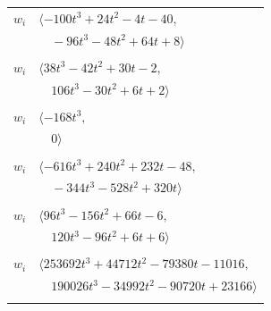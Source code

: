 \documentclass[11pt]{article}
\begin{document}
\begin{longtable}{@{}ll@{}}
$w_i$ & $\langle -100t^{3}+24t^{2}-4t-40,$\\
 & $\quad -96t^{3}-48t^{2}+64t+8\rangle$\\
\addlinespace[2pt]
\multicolumn{2}{@{}p{0.97\textwidth}@{}}{$i=33$, $D_i=6$, $\rho_{ij}$: $11{:}1, \allowbreak 26{:}1, \allowbreak 28{:}1, \allowbreak 29{:}2, \allowbreak 34{:}1, \allowbreak 38{:}2, \allowbreak 40{:}2, \allowbreak 43{:}2$}\\
$w_i$ & $\langle 38t^{3}-42t^{2}+30t-2,$\\
 & $\quad 106t^{3}-30t^{2}+6t+2\rangle$\\
\addlinespace[2pt]
\multicolumn{2}{@{}p{0.97\textwidth}@{}}{$i=34$, $D_i=12$, $\rho_{ij}$: $8{:}2, \allowbreak 9{:}2, \allowbreak 11{:}2, \allowbreak 23{:}1, \allowbreak 33{:}2$}\\
$w_i$ & $\langle -168t^{3},$\\
 & $\quad 0\rangle$\\
\addlinespace[2pt]
\multicolumn{2}{@{}p{0.97\textwidth}@{}}{$i=35$, $D_i=24$, $\rho_{ij}$: $2{:}2, \allowbreak 11{:}1, \allowbreak 21{:}2, \allowbreak 23{:}2, \allowbreak 24{:}1, \allowbreak 27{:}1, \allowbreak 28{:}2, \allowbreak 37{:}1$}\\
$w_i$ & $\langle -616t^{3}+240t^{2}+232t-48,$\\
 & $\quad -344t^{3}-528t^{2}+320t\rangle$\\
\addlinespace[2pt]
\multicolumn{2}{@{}p{0.97\textwidth}@{}}{$i=36$, $D_i=6$, $\rho_{ij}$: $4{:}1, \allowbreak 9{:}2, \allowbreak 10{:}2, \allowbreak 31{:}1, \allowbreak 38{:}2, \allowbreak 42{:}1$}\\
$w_i$ & $\langle 96t^{3}-156t^{2}+66t-6,$\\
 & $\quad 120t^{3}-96t^{2}+6t+6\rangle$\\
\addlinespace[2pt]
\multicolumn{2}{@{}p{0.97\textwidth}@{}}{$i=37$, $D_i=36$, $e_i=1$, $\rho_{ij}$: $5{:}2, \allowbreak 8{:}2, \allowbreak 10{:}1, \allowbreak 12{:}2, \allowbreak 13{:}1, \allowbreak 14{:}1, \allowbreak 19{:}2, \allowbreak 20{:}2, \allowbreak 24{:}2, \allowbreak 26{:}2, \allowbreak 35{:}2, \allowbreak 40{:}1, \allowbreak 41{:}1, \allowbreak 42{:}2$}\\
$w_i$ & $\langle 253692t^{3}+44712t^{2}-79380t-11016,$\\
 & $\quad 190026t^{3}-34992t^{2}-90720t+23166\rangle$\\
\addlinespace[2pt]
\multicolumn{2}{@{}p{0.97\textwidth}@{}}{$i=38$, $D_i=54$, $e_i=1$, $\rho_{ij}$: $6{:}1, \allowbreak 7{:}2, \allowbreak 8{:}1, \allowbreak 10{:}2, \allowbreak 11{:}2, \allowbreak 22{:}1, \allowbreak 26{:}1, \allowbreak 27{:}1, \allowbreak 32{:}1, \allowbreak 33{:}1, \allowbreak 36{:}1, \allowbreak 42{:}2$}\\

\end{longtable}
\end{document}
